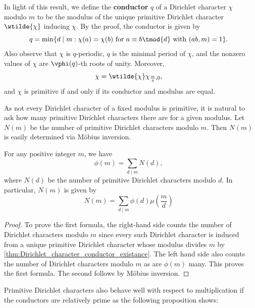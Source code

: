 \documentclass[12pt]{article}
\begin{document}
      In light of this result, we define the \textbf{conductor} \(q\) of a Dirichlet character \(\chi\) modulo \(m\) to be the modulus of the unique primitive Dirichlet character \(\wtilde{\chi}\) inducing \(\chi\). By the proof, the conductor is given by
      \[
        q = \min\{d \mid m:\chi(a) = \chi(b) \text{ for } a \equiv b \tmod{d} \text{ with } (ab,m) = 1\}.
      \]
      Also observe that \(\chi\) is \(q\)-periodic, \(q\) is the minimal period of \(\chi\), and the nonzero values of \(\chi\) are \(\vphi(q)\)-th roots of unity. Moreover,
      \[
        \chi = \wtilde{\chi}\chi_{\frac{m}{q},0},
      \]
      and \(\chi\) is primitive if and only if its conductor and modulus are equal.
      
      As not every Dirichlet character of a fixed modulus is primitive, it is natural to ask how many primitive Dirichlet characters there are for a given modulus. Let \(N(m)\) be the number of primitive Dirichlet characters modulo \(m\). Then \(N(m)\) is easily determined via M\"obius inversion.

      \begin{proposition}
        For any positive integer \(m\), we have
        \[
          \phi(m) = \sum_{d \mid m}N(d),
        \]
        where \(N(d)\) be the number of primitive Dirichlet characters modulo \(d\). In particular, \(N(m)\) is given by
        \[
          N(m) = \sum_{d \mid m}\phi(d)\mu\left(\frac{m}{d}\right)
        \]
      \end{proposition}
      \begin{proof}
        To prove the first formula, the right-hand side counts the number of Dirichlet characters modulo \(m\) since every such Dirichlet character is induced from a unique primitive Dirichlet character whose modulus divides \(m\) by \cref{thm:Dirichlet_character_conductor_existance}. The left hand side also counts the number of Dirichlet characters modulo \(m\) as are \(\phi(m)\) many. This proves the first formula. The second follows by M\"obius inversion.
      \end{proof}

      Primitive Dirichlet characters also behave well with respect to multiplication if the conductors are relatively prime as the following proposition shows:
\end{document}
